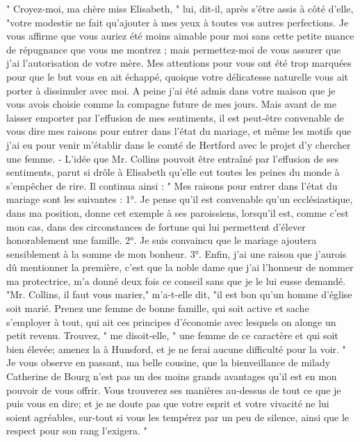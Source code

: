 " Croyez-moi, ma chère miss Elisabeth, " lui, dit-il, après s'être assis à côté d'elle, "votre modestie ne fait qu'ajouter à mes yeux à toutes vos autres perfections. Je vous affirme que vous auriez été moins aimable pour moi sans cette petite nuance de répugnance que vous me montrez ; mais permettez-moi de vous assurer que j'ai l'autorisation de votre mère. Mes attentions pour vous ont été trop marquées pour que le but vous en ait échappé, quoique votre délicatesse naturelle vous ait porter à dissimuler avec moi. A peine j'ai été admis dans votre maison que je vous avois choisie comme la compagne\setcounter{page}{407} future de mes jours. Mais avant de me laisser emporter par l'effusion de mes sentiments, il est peut-être convenable de vous dire mes raisons pour entrer dans l'état du mariage, et même les motifs que j'ai eu pour venir m'établir dans le comté de Hertford avec le projet d'y chercher une femme.
- L'idée que Mr. Collins pouvoit être entraîné par l'effusion de ses sentiments, parut si drôle à Elisabeth qu'elle eut toutes les peines du monde à s'empêcher de rire. Il continua ainsi :
" Mes raisons pour entrer dans l'état du mariage sont les suivantes : 1°. Je pense qu'il est convenable qu'un ecclésiastique, dans ma position, donne cet exemple à ses paroissiens, lorsqu'il est, comme c'est mon cas, dans des circonstances de fortune qui lui permettent d'élever honorablement une famille. 2°. Je suis convaincu que le mariage ajoutera sensiblement à la somme de mon bonheur. 3°. Enfin, j'ai une raison que j'aurois dû mentionner la première, c'est que la noble dame que j'ai l'honneur de nommer ma protectrice, m'a donné deux fois ce conseil sans que je le lui eusse demandé. "Mr. Collins, il faut vous marier," m'a-t-elle dit, "il est bon qu'un homme d'église soit marié. Prenez\setcounter{page}{408} une femme de bonne famille, qui soit active et sache s'employer à tout, qui ait ces principes d'économie avec lesquels on alonge un petit revenu. Trouvez, " me disoit-elle, " une femme de ce caractère et qui soit bien élevée; amenez la à Hunsford, et je ne ferai aucune difficulté pour la voir. " Je vous observe en passant, ma belle cousine, que la bienveillance de milady Catherine de Bourg n'est pas un des moins grands avantages qu'il est en mon pouvoir de vous offrir. Vous trouverez ses manières au-dessus de tout ce que je puis vous en dire; et je ne doute pas que votre esprit et votre vivacité ne lui soient agréables, sur-tout si vous les tempérez par un peu de silence, ainsi que le respect pour son rang l'exigera. "

